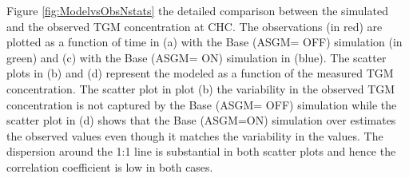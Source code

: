 \begin{flushleft}
  Figure \ref{fig:ModelvsObsNstats} the detailed comparison between the simulated \hg  and the observed TGM concentration at CHC. The observations (in red) are plotted as a function of time in (a) with the Base (ASGM= OFF) simulation (in green) and (c) with the Base (ASGM= ON) simulation in (blue). The scatter plots in (b) and (d) represent the modeled \hg  as a function of the measured TGM concentration. The scatter plot in plot (b) the variability in the observed TGM concentration is not captured by the Base (ASGM= OFF) simulation while the scatter plot in (d) shows that the Base (ASGM=ON) simulation over estimates the observed values even though it matches the variability in the values. The dispersion around the 1:1 line is substantial in both scatter plots and hence the correlation coefficient is low in both cases. 
\end{flushleft}


